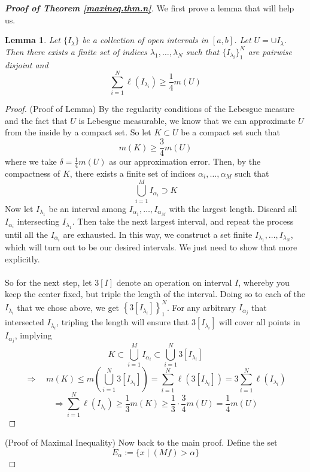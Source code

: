 \documentclass[12pt]{article}
\theoremstyle{plain}
\newtheorem{lem}[thm]{Lemma}
\theoremstyle{definition}
\theoremstyle{remark}
\begin{document}
\begin{proof}[\textbf{Proof of Theorem \hyperlink{maxineq.thm}{\ref*{maxineq.thm.n}}}]
We first prove a lemma that will help us. 
\begin{lem}
Let $\{I_\lambda\}$ be a collection of open intervals in $[a,b]$. Let $U=\cup I_\lambda$. Then there exists a finite set of indices $\lambda_1,\ldots,\lambda_N$ such that $\{I_{\lambda_i}\}^N_1$ are pairwise disjoint and 
\[
    \sum_{i=1}^N \ell(I_{\lambda_i}) \geq \frac{1}{4}m(U)
\]
\end{lem}
\begin{proof}
(Proof of Lemma) By the regularity conditions of the Lebesgue measure and the fact that $U$ is Lebesgue measurable, we know that we can approximate $U$ from the inside by a compact set. So let $K\subset U$ be a compact set such that
\[
    m(K)\geq \frac{3}{4} m(U)
\]
where we take $\delta=\frac{1}{4}m(U)$ as our approximation error. Then, by the compactness of $K$, there exists a finite set of indices $\alpha_i,\ldots,\alpha_M$ such that
\[
    \bigcup_{i=1}^M I_{\alpha_i} \supset K
\]
Now let $I_{\lambda_1}$ be an interval among $I_{\alpha_1},\ldots,I_{\alpha_M}$ with the largest length. Discard all $I_{\alpha_i}$ intersecting $I_{\lambda_1}$. Then take the next largest interval, and repeat the process until all the $I_{\alpha_i}$ are exhausted. In this way, we construct a set finite $I_{\lambda_1},\ldots,I_{\lambda_N}$, which will turn out to be our desired intervals. We just need to show that more explicitly.
\\
\\
So for the next step, let $3[I]$ denote an operation on interval $I$, whereby you keep the center fixed, but triple the length of the interval. Doing so to each of the $I_{\lambda_i}$ that we chose above, we get $\left\{3[I_{\lambda_i}]\right\}^N_1$. For any arbitrary $I_{\alpha_j}$ that intersected $I_{\lambda_i}$,  tripling the length will ensure that $3[I_{\lambda_i}]$ will cover all points in $I_{\alpha_j}$, implying
\[
    K\subset \bigcup_{i=1}^M I_{\alpha_i} \subset 
    \bigcup_{i=1}^N 3[I_{\lambda_i}]
\]
\[
    \Rightarrow\quad
    m(K)\leq 
    m\left(\bigcup_{i=1}^N 3[I_{\lambda_i}]\right) = 
    \sum_{i=1}^N \ell(3[I_{\lambda_i}]) = 
    3\sum_{i=1}^N \ell(I_{\lambda_i}) 
\]
\[
    \Rightarrow
    \sum_{i=1}^N\ell(I_{\lambda_i}) \geq
    \frac{1}{3} m(K) \geq 
    \frac{1}{3}\cdot\frac{3}{4}m(U) = 
    \frac{1}{4}m(U)
\]
\end{proof}
(Proof of Maximal Inequality) Now back to the main proof. Define the set 
\[
    E_\alpha := \{x\;|\; (Mf) >\alpha\} 
\]
\end{proof}
\end{document}
